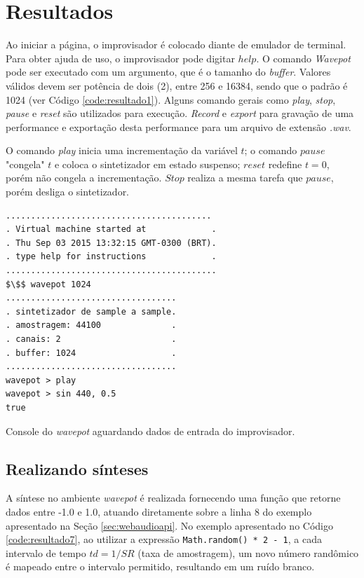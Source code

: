 \section{Resultados}\label{sec:resultados}

Ao iniciar a página, o improvisador é colocado diante de emulador de terminal. Para obter ajuda de uso, o improvisador pode digitar $help$.
O comando \emph{Wavepot} pode ser executado com um argumento, que é o tamanho do \emph{buffer}.
Valores válidos devem ser potência de dois (2), entre 256 e 16384, sendo que o padrão é 1024 (ver Código \ref{code:resultado1}).
Alguns comando gerais como \emph{play}, \emph{stop}, \emph{pause} e \emph{reset} são utilizados para execução. 
\emph{Record} e \emph{export} para gravação de uma performance e exportação desta performance para um arquivo de extensão \emph{.wav}.

O comando \emph{play} inicia uma incrementação da variável $t$; o comando $pause$ "congela" $t$ e coloca o sintetizador em estado suspenso; $reset$ redefine $t=0$, porém não congela a incrementação. $Stop$ realiza a mesma tarefa que $pause$, porém desliga o sintetizador.

\begin{listing}
\begin{verbatim}
.........................................
. Virtual machine started at             .
. Thu Sep 03 2015 13:32:15 GMT-0300 (BRT).
. type help for instructions             .
..........................................
$\$$ wavepot 1024
..................................
. sintetizador de sample a sample. 
. amostragem: 44100              .
. canais: 2                      .
. buffer: 1024                   .
..................................
wavepot > play
wavepot > sin 440, 0.5
true
\end{verbatim}
\caption{Console do \emph{wavepot} aguardando dados de entrada do improvisador.}
\label{code:resultado1}
\end{listing}

\subsection*{Realizando sínteses}

A síntese no ambiente \emph{wavepot} é realizada fornecendo uma função que retorne dados entre -1.0 e 1.0, atuando diretamente sobre a linha 8 do exemplo apresentado na Seção \ref{sec:webaudioapi}.
No exemplo apresentado no Código \ref{code:resultado7}, ao utilizar a expressão \verb|Math.random() * 2 - 1|, a cada intervalo de tempo $td=1/SR$ (taxa de amostragem), um novo número randômico é mapeado entre o intervalo permitido, resultando em um ruído branco.


